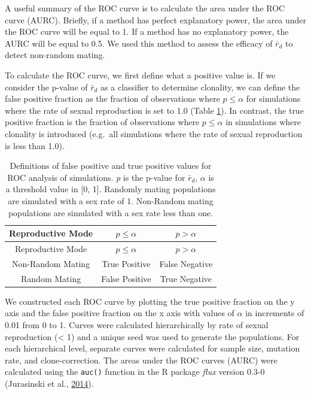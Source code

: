\documentclass[double,11pt]{beavtex}
\begin{document}
  A useful summary of the ROC curve is to calculate the area under the ROC
  curve (AURC). Briefly, if a method has perfect explanatory power, the
  area under the ROC curve will be equal to 1. If a method has no
  explanatory power, the AURC will be equal to 0.5. We used this method to
  assess the efficacy of \(\bar{r}_d\) to detect non-random mating.
  
  To calculate the ROC curve, we first define what a positive value is. If
  we consider the p-value of \(\bar{r}_d\) as a classifier to determine
  clonality, we can define the false positive fraction as the fraction of
  observations where \(p \leq \alpha\) for simulations where the rate of
  sexual reproduction is set to 1.0 (Table \ref{tab:simtab1}). In
  contrast, the true positive fraction is the fraction of observations
  where \(p \leq \alpha\) in simulations where clonality is introduced
  (e.g.~all simulations where the rate of sexual reproduction is less than
  1.0).
  
  \begin{longtable}[]{@{}ccc@{}}
  \caption{\label{tab:simtab1} Definitions of false positive and true positive
  values for ROC analysis of simulations. \emph{p} is the p-value for
  \(\bar{r}_d\), \(\alpha\) is a threshold value in {[}0, 1{]}. Randomly
  mating populations are simulated with a sex rate of 1. Non-Random mating
  populations are simulated with a sex rate less than one.}\tabularnewline
  \toprule
  Reproductive Mode & \(p \leq \alpha\) & \(p > \alpha\)\tabularnewline
  \midrule
  \endfirsthead
  \toprule
  Reproductive Mode & \(p \leq \alpha\) & \(p > \alpha\)\tabularnewline
  \midrule
  \endhead
  Non-Random Mating & True Positive & False Negative\tabularnewline
  Random Mating & False Positive & True Negative\tabularnewline
  \bottomrule
  \end{longtable}
  
  We constructed each ROC curve by plotting the true positive fraction on
  the y axis and the false positive fraction on the x axis with values of
  \(\alpha\) in increments of 0.01 from 0 to 1. Curves were calculated
  hierarchically by rate of sexual reproduction (\textless{} 1) and a
  unique seed was used to generate the populations. For each hierarchical
  level, separate curves were calculated for sample size, mutation rate,
  and clone-correction. The areas under the ROC curves (AURC) were
  calculated using the \texttt{auc()} function in the R package
  \emph{flux} version 0.3-0 (Jurasinski et al.,
  \protect\hyperlink{ref-jurasinski2014flux}{2014}).
  
\end{document}
